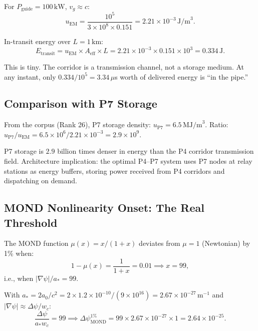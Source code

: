 \documentclass[aps,prd,twocolumn,superscriptaddress]{revtex4-2}
\begin{document}
For $P_\mathrm{guide} = 100\,\mathrm{kW}$, $v_g \approx c$:
\begin{equation}
u_\mathrm{EM} = \frac{10^5}{3\times10^8\times0.151} = 2.21\times10^{-3}\,\mathrm{J/m}^3.
\end{equation}

In-transit energy over $L = 1\,\mathrm{km}$:
\begin{equation}
E_\mathrm{transit} = u_\mathrm{EM}\times A_\mathrm{eff}\times L
= 2.21\times10^{-3}\times0.151\times10^3 = 0.334\,\mathrm{J}.
\end{equation}

This is tiny.  The corridor is a transmission channel, not a storage
medium.  At any instant, only $0.334/10^5 = 3.34\,\mu$s worth of
delivered energy is ``in the pipe.''

\subsection{Comparison with P7 Storage}

From the corpus (Rank 26), P7 storage density: $u_\mathrm{P7} = 6.5\,\mathrm{MJ/m}^3$.
Ratio: $u_\mathrm{P7}/u_\mathrm{EM} = 6.5\times10^6/2.21\times10^{-3}
= 2.9\times10^9$.

P7 storage is $2.9$ billion times denser in energy than the P4
corridor transmission field.  Architecture implication: the optimal
P4--P7 system uses P7 nodes at relay stations as energy buffers,
storing power received from P4 corridors and dispatching on demand.

\subsection{MOND Nonlinearity Onset: The Real Threshold}

The MOND function $\mu(x) = x/(1+x)$ deviates from $\mu = 1$
(Newtonian) by 1\% when:
\begin{equation}
1 - \mu(x) = \frac{1}{1+x} = 0.01 \implies x = 99,
\end{equation}
i.e., when $|\nabla\psi|/a_* = 99$.

With $a_* = 2a_0/c^2 = 2\times1.2\times10^{-10}/(9\times10^{16})
= 2.67\times10^{-27}\,\mathrm{m}^{-1}$ and $|\nabla\psi|\approx\Delta\psi/w_c$:
\begin{equation}
\frac{\Delta\psi}{a_* w_c} = 99
\implies \Delta\psi_\mathrm{MOND}^{1\%} = 99\times2.67\times10^{-27}\times1
= 2.64\times10^{-25}.
\end{equation}
\end{document}
